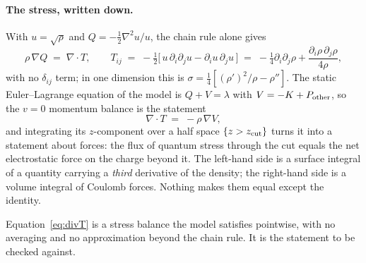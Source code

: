 \documentclass[11pt]{article}
\newcommand{\grad}{\nabla}
\begin{document}
\paragraph{The stress, written down.} With $u=\sqrt\rho$ and $Q=-\tfrac12\grad^2u/u$, the chain rule
alone gives
\begin{equation}\label{eq:stress}
\rho\,\grad Q \;=\; \grad\cdot T,\qquad
T_{ij} \;=\; -\tfrac12\big[\,u\,\partial_i\partial_j u - \partial_i u\,\partial_j u\,\big]
\;=\; -\tfrac14\partial_i\partial_j\rho + \frac{\partial_i\rho\,\partial_j\rho}{4\rho},
\end{equation}
with no $\delta_{ij}$ term; in one dimension this is $\sigma=\tfrac14[(\rho')^2/\rho-\rho'']$. The
static Euler--Lagrange equation of the model is $Q+V=\lambda$ with $V=-K+P_{\rm other}$, so the
$v=0$ momentum balance is the statement
\begin{equation}\label{eq:divT}
\grad\cdot T \;=\; -\rho\,\grad V ,
\end{equation}
and integrating its $z$-component over a half space $\{z>z_{\rm cut}\}$ turns it into a statement
about forces: the flux of quantum stress through the cut equals the net electrostatic force on the
charge beyond it. The left-hand side is a surface integral of a quantity carrying a \emph{third}
derivative of the density; the right-hand side is a volume integral of Coulomb forces. Nothing makes
them equal except the identity.


Equation~\eqref{eq:divT} is a stress balance the model satisfies pointwise, with no averaging and
no approximation beyond the chain rule. It is the statement to be checked against.
\end{document}
